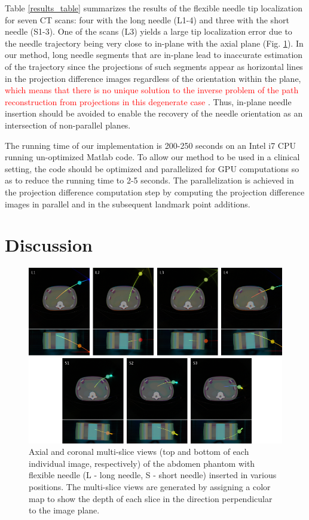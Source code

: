Table \ref{results_table} summarizes the results of the flexible needle tip localization for seven CT scans: four with the long needle (L1-4) and three with the short needle (S1-3). One of the scans (L3) yields a large tip localization error due to the needle trajectory being very close to in-plane with the axial plane (Fig. \ref{multislices_fig}). In our method, long needle segments that are in-plane lead to inaccurate estimation of the trajectory since the projections of such segments appear as horizontal lines in the projection difference images regardless of the orientation within the plane, \textcolor{red}{which means that there is no unique solution to the inverse problem of the path reconstruction from projections in this degenerate case} \cite{medan2017reduced}. Thus, in-plane needle insertion should be avoided to enable the recovery of the needle orientation as an intersection of non-parallel planes.

The running time of our implementation is 200-250 seconds on an Intel i7 CPU running un-optimized Matlab code. To allow our method to be used in a clinical setting, the code should be optimized and parallelized for GPU computations so as to reduce the running time to 2-5 seconds. The parallelization is achieved in the projection difference computation step by computing the projection difference images in parallel and in the subsequent landmark point additions.  

\section*{Discussion}

\begin{figure}[t]
\centering
\includegraphics[width=\textwidth]{multislices.png}
\caption{Axial and coronal multi-slice views (top and bottom of each individual image, respectively) of the abdomen phantom with flexible needle (L - long needle, S - short needle) inserted in various positions. The multi-slice views are generated by assigning a color map to show the depth of each slice in the direction perpendicular to the image plane.}
\label{multislices_fig}
\end{figure}

